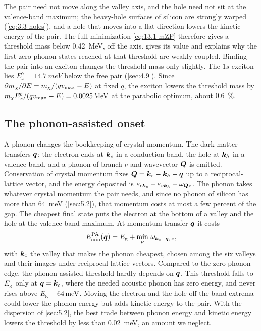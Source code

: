 The pair need not move along the valley axis, and the hole need not sit at the valence-band maximum; the heavy-hole surfaces of silicon are strongly warped (\cref{eq:3.3-holes}), and a hole that moves into a flat direction lowers the kinetic energy of the pair. The full minimization \cref{eq:13.1-mZP} therefore gives a threshold mass below \SI{0.42}{MeV}, off the axis.  gives its value and explains why the first zero-phonon states reached at that threshold are weakly coupled. Binding the pair into an exciton changes the threshold mass only slightly. The $1s$ exciton lies $E_x^b = \SI{14.7}{meV}$ below the free pair (\cref{sec:4.9}). Since $\partial m_{\chi}/\partial E = m_{\chi}/(qv_{\mathrm{max}} - E)$ at fixed $q$, the exciton lowers the threshold mass by $m_{\chi} E_x^b/(qv_{\mathrm{max}} - E) = \SI{0.0025}{MeV}$ at the parabolic optimum, about \SI{0.6}{\percent}.

\subsection{The phonon-assisted onset}

A phonon changes the bookkeeping of crystal momentum. The dark matter transfers $\bm{q}$; the electron ends at $\bm{k}_e$ in a conduction band, the hole at $\bm{k}_h$ in a valence band, and a phonon of branch $\nu$ and wavevector $\bm{Q}$ is emitted. Conservation of crystal momentum fixes $\bm{Q} = \bm{k}_e - \bm{k}_h - \bm{q}$ up to a reciprocal-lattice vector, and the energy deposited is $\varepsilon_{c\bm{k}_e} - \varepsilon_{v\bm{k}_h} + \omega_{\bm{Q}\nu}$. The phonon takes whatever crystal momentum the pair needs, and since no phonon of silicon has more than \SI{64}{meV} (\cref{sec:5.2}), that momentum costs at most a few percent of the gap. The cheapest final state puts the electron at the bottom of a valley and the hole at the valence-band maximum. At momentum transfer $\bm{q}$ it costs
\begin{equation}
  E_{\mathrm{min}}^{\mathrm{PA}}(\bm{q}) = E_{\mathrm{g}} + \min_\nu\,\omega_{\bm{k}_{\mathrm{c}} - \bm{q},\,\nu} ,
  \label{eq:13.1-EPA}
\end{equation}
with $\bm{k}_{\mathrm{c}}$ the valley that makes the phonon cheapest, chosen among the six valleys and their images under reciprocal-lattice vectors. Compared to the zero-phonon edge, the phonon-assisted threshold hardly depends on $\bm{q}$. This threshold falls to $E_{\mathrm{g}}$ only at $\bm{q} = \bm{k}_{\mathrm{c}}$, where the needed acoustic phonon has zero energy, and never rises above $E_{\mathrm{g}} + \SI{64}{meV}$. Moving the electron and the hole off the band extrema could lower the phonon energy but adds kinetic energy to the pair. With the dispersion of \cref{sec:5.2}, the best trade between phonon energy and kinetic energy lowers the threshold by less than \SI{0.02}{meV}, an amount we neglect.

